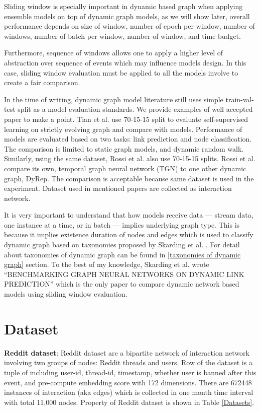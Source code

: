 \documentclass{IEEEtran}
\begin{document}
Sliding window is specially important in dynamic based graph when applying ensemble models on top of dynamic graph models, as we will show later, overall performance depends on size of window, number of epoch per window, number of windows, number of batch per window, number of window, and time budget.

Furthermore, sequence of windows allows one to apply a higher level of abstraction over sequence of events which may influence models design. In this case, sliding window evaluation must be applied to all the models involve to create a fair comparison.

In the time of writing, dynamic graph model literature still uses simple train-val-test split as a model evaluation standards. We provide examples of well accepted paper to make a point. Tian et al. \cite{tian2021self} use 70-15-15 split to evaluate self-supervised learning on strictly evolving graph and compare with models. Performance of models are evaluated based on two tasks: link prediction and node classification. The comparison is limited to static graph models, and dynamic random walk. Similarly, using the same dataset, Rossi et al. \cite{rossi2020temporal} also use 70-15-15 splits. Rossi et al. compare its own, temporal graph neural network (TGN) to one other dynamic graph, DyRep. The comparison is acceptable because same dataset is used in the experiment. Dataset used in mentioned papers are collected as interaction network.

It is very important to understand that how models receive data --- stream data, one instance at a time, or in batch --- implies underlying graph type. This is because it implies existence duration of nodes and edges which is used to classify dynamic graph based on taxonomies proposed by Skarding et al. \cite{skardingFoundationsModelingDynamic2021}. For detail about taxonomies of dynamic graph can be found in \ref{taxonomies of dynamic graph} section.
To the best of my knowledge, Skarding et al. wrote ``BENCHMARKING GRAPH NEURAL NETWORKS ON DYNAMIC LINK PREDICTION'' \cite{skarding2021benchmarking} which is the only paper to compare dynamic network based models using sliding window evaluation.




\section{Dataset}
\label{sec:orgf6315f1}
\textbf{Reddit dataset}: Reddit dataset are a bipartite network of interaction network involving two groups of nodes: Reddit threads and users. Row of the dataset is a tuple of including user-id, thread-id, timestamp, whether user is banned after this event, and pre-compute embedding score with 172 dimensions. There are 672448 instances of interaction (aka edges) which is collected in one month time interval with total 11,000 nodes. Property of Reddit dataset is shown in Table \ref{Datasets}.
\end{document}

